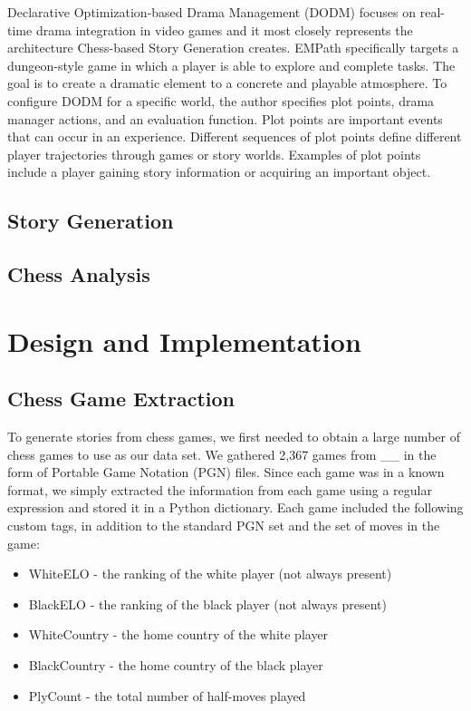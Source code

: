 \documentclass[journal]{./IEEEtran}
\begin{document}
Declarative Optimization-based Drama Management (DODM) focuses on real-time drama integration in video games and it most closely represents the architecture Chess-based Story Generation creates. EMPath \cite{empath} specifically targets a dungeon-style game in which a player is able to explore and complete tasks. The goal is to create a dramatic element to a concrete and playable atmosphere. To configure DODM for a specific world, the author specifies plot points, drama manager actions, and an evaluation function. Plot points are important events that can occur in an experience. Different sequences of plot points define different player trajectories through games or story worlds. Examples of plot points include a player gaining story information or acquiring an important object. 

\subsection{Story Generation}

\subsection{Chess Analysis}

\section{\sysname{} Design and Implementation}

\subsection{Chess Game Extraction} 
To generate stories from chess games, we first needed to obtain a large number of chess games to use as our data set. We gathered 2,367 games from \_\_ in the form of Portable Game Notation (PGN) files. Since each game was in a known format, we simply extracted the information from each game using a regular expression and stored it in a Python dictionary. Each game included the following custom tags, in addition to the standard PGN set \cite{pgntags} and the set of moves in the game:
\begin{itemize} 
\item WhiteELO - the ranking of the white player (not always present)
\item BlackELO - the ranking of the black player (not always present)
\item WhiteCountry - the home country of the white player
\item BlackCountry - the home country of the black player
\item PlyCount - the total number of half-moves played
\end{itemize}
\end{document}

